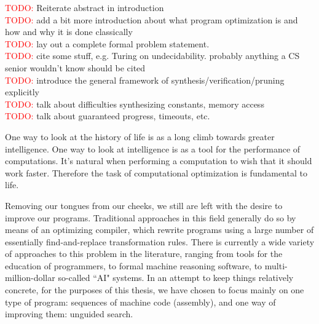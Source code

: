 \documentclass[12pt,twoside]{reedthesis}
\newcommand{\red}[1]{\textcolor{red}{#1}}
\begin{document}
        \red{TODO:} Reiterate abstract in introduction
     \\ \red{TODO:} add a bit more introduction about what program optimization is and how and why it is done classically
     \\ \red{TODO:} lay out a complete formal problem statement. 
     \\ \red{TODO:} cite some stuff, e.g. Turing on undecidability. probably anything a CS senior wouldn't know should be cited
     \\ \red{TODO:} introduce the general framework of synthesis/verification/pruning explicitly
     \\ \red{TODO:} talk about difficulties synthesizing constants, memory access
     \\ \red{TODO:} talk about guaranteed progress, timeouts, etc.
    
    One way to look at the history of life is as a long climb towards greater intelligence.
    One way to look at intelligence is as a tool for the performance of computations.
    It's natural when performing a computation to wish that it should work faster.
    Therefore the task of computational optimization is fundamental to life.
    
    Removing our tongues from our cheeks, we still are left with the desire to improve our programs. 
    Traditional approaches in this field generally do so by means of an optimizing compiler, which rewrite programs using a large number of essentially find-and-replace transformation rules.
    There is currently a wide variety of approaches to this problem in the literature, ranging from tools for the education of programmers, to formal machine reasoning software, to multi-million-dollar so-called ``AI" systems.
    In an attempt to keep things relatively concrete, for the purposes of this thesis, we have chosen to focus mainly on one type of program: sequences of machine code (assembly), and one way of improving them: unguided search.
    
\end{document}
